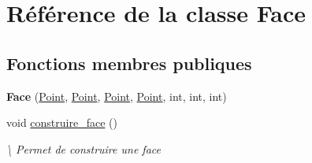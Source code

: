 \hypertarget{classFace}{\section{Référence de la classe Face}
\label{classFace}
}
\subsection*{Fonctions membres publiques}
\begin{DoxyCompactItemize}
\item 
\hypertarget{classFace_a0d5b793f0b5f3b3f5b2bdb9350ab0f5e}{{\bfseries Face} (\hyperlink{classPoint}{Point}, \hyperlink{classPoint}{Point}, \hyperlink{classPoint}{Point}, \hyperlink{classPoint}{Point}, int, int, int)}\label{classFace_a0d5b793f0b5f3b3f5b2bdb9350ab0f5e}

\item 
\hypertarget{classFace_a3388255c476883e6c35af3f2a8e12a27}{void \hyperlink{classFace_a3388255c476883e6c35af3f2a8e12a27}{construire\-\_\-face} ()}\label{classFace_a3388255c476883e6c35af3f2a8e12a27}

\begin{DoxyCompactList}\small\item\em \textbackslash{} Permet de construire une face \end{DoxyCompactList}\end{DoxyCompactItemize}
